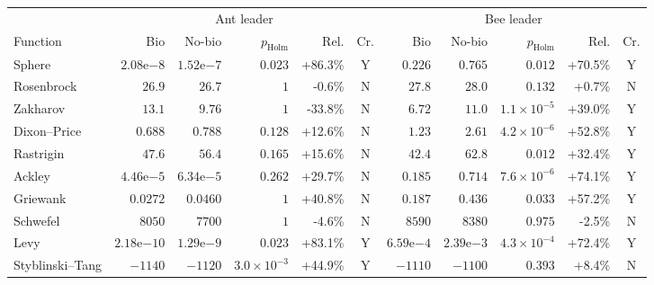 \begin{tabular}{lrrrrcrrrrc}
\toprule
 & \multicolumn{5}{c}{Ant leader} & \multicolumn{5}{c}{Bee leader} \\
Function & Bio & No-bio & $p_{\mathrm{Holm}}$ & Rel. & Cr. & Bio & No-bio & $p_{\mathrm{Holm}}$ & Rel. & Cr. \\
\midrule
Sphere & $2.08\mathrm{e}{-8}$ & $1.52\mathrm{e}{-7}$ & $0.023$ & +86.3\% & Y & $0.226$ & $0.765$ & $0.012$ & +70.5\% & Y \\
Rosenbrock & $26.9$ & $26.7$ & $1$ & -0.6\% & N & $27.8$ & $28.0$ & $0.132$ & +0.7\% & N \\
Zakharov & $13.1$ & $9.76$ & $1$ & -33.8\% & N & $6.72$ & $11.0$ & $1.1\times10^{-5}$ & +39.0\% & Y \\
Dixon--Price & $0.688$ & $0.788$ & $0.128$ & +12.6\% & N & $1.23$ & $2.61$ & $4.2\times10^{-6}$ & +52.8\% & Y \\
Rastrigin & $47.6$ & $56.4$ & $0.165$ & +15.6\% & N & $42.4$ & $62.8$ & $0.012$ & +32.4\% & Y \\
Ackley & $4.46\mathrm{e}{-5}$ & $6.34\mathrm{e}{-5}$ & $0.262$ & +29.7\% & N & $0.185$ & $0.714$ & $7.6\times10^{-6}$ & +74.1\% & Y \\
Griewank & $0.0272$ & $0.0460$ & $1$ & +40.8\% & N & $0.187$ & $0.436$ & $0.033$ & +57.2\% & Y \\
Schwefel & $8050$ & $7700$ & $1$ & -4.6\% & N & $8590$ & $8380$ & $0.975$ & -2.5\% & N \\
Levy & $2.18\mathrm{e}{-10}$ & $1.29\mathrm{e}{-9}$ & $0.023$ & +83.1\% & Y & $6.59\mathrm{e}{-4}$ & $2.39\mathrm{e}{-3}$ & $4.3\times10^{-4}$ & +72.4\% & Y \\
Styblinski--Tang & $-1140$ & $-1120$ & $3.0\times10^{-3}$ & +44.9\% & Y & $-1110$ & $-1100$ & $0.393$ & +8.4\% & N \\
\bottomrule
\end{tabular}
